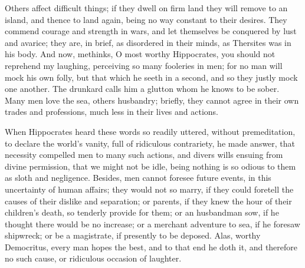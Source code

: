 {Others affect difficult things; if they dwell on firm land they
will remove to an island, and thence to land again, being no way
constant to their desires. They commend courage and strength in wars,
and let themselves be conquered by lust and avarice; they are, in
brief, as disordered in their minds, as Thersites was in his body. And
now, methinks, O most worthy Hippocrates, you should not reprehend my
laughing, perceiving so many fooleries in men; for no man will
mock his own folly, but that which he seeth in a second, and so they
justly mock one another. The drunkard calls him a glutton whom he knows
to be sober. Many men love the sea, others husbandry; briefly, they
cannot agree in their own trades and professions, much less in their
lives and actions.

When Hippocrates heard these words so readily uttered, without
premeditation, to declare the world's vanity, full of ridiculous
contrariety, he made answer, that necessity compelled men to many such
actions, and divers wills ensuing from divine permission, that we might
not be idle, being nothing is so odious to them as sloth and
negligence. Besides, men cannot foresee future events, in this
uncertainty of human affairs; they would not so marry, if they could
foretell the causes of their dislike and separation; or parents, if
they knew the hour of their children's death, so tenderly provide for
them; or an husbandman sow, if he thought there would be no increase;
or a merchant adventure to sea, if he foresaw shipwreck; or be a
magistrate, if presently to be deposed. Alas, worthy Democritus, every
man hopes the best, and to that end he doth it, and therefore no such
cause, or ridiculous occasion of laughter.

}
